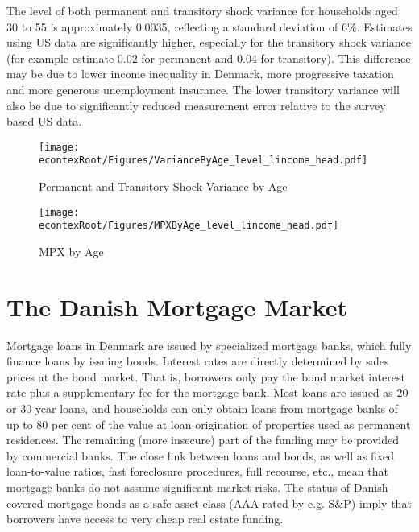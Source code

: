 \documentclass[titlepage]{\econtex}\newcommand{\texname}{ConsumptionHeterogeneity}
\begin{document}
The level of both permanent and transitory shock variance for households aged 30 to 55 is approximately 0.0035, reflecting a standard deviation of 6\%. Estimates using US data are significantly higher, especially for the transitory shock variance (for example \cite{carroll_nature_1997} estimate 0.02 for permanent and 0.04 for transitory). This difference may be due to lower income inequality in Denmark, more progressive taxation and more generous unemployment insurance. The lower transitory variance will also be due to significantly reduced measurement error relative to the survey based US data. 
\begin{figure} 
	\begin{centering}
		\texttt{[image: \\econtexRoot/Figures/VarianceByAge\_level\_lincome\_head.pdf]} 
		\caption{Permanent and Transitory Shock Variance by Age}
		\label{fig:VarianceByAge}
	\end{centering}
\end{figure}
\begin{figure} 
	\begin{centering}
		\texttt{[image: \\econtexRoot/Figures/MPXByAge\_level\_lincome\_head.pdf]} 
		\caption{MPX by Age}
		\label{fig:MPXByAge}
	\end{centering}
\end{figure}

\section{The Danish Mortgage Market} \label{mortgage_market}
\setcounter{figure}{0}   
\setcounter{table}{0} 
Mortgage loans in Denmark are issued by specialized mortgage banks, which fully finance loans by issuing bonds. Interest rates are directly determined by sales prices at the bond market. That is, borrowers only pay the bond market interest rate plus a supplementary fee for the mortgage bank. 
Most loans are issued as 20 or 30-year loans, and households can only obtain loans from mortgage banks of up to 80 per cent of the value at loan origination of properties used as permanent residences. The remaining (more insecure) part of the funding may be provided by commercial banks. The close link between loans and bonds, as well as fixed loan-to-value ratios, fast foreclosure procedures, full recourse, etc., mean that mortgage banks do not assume significant market risks. The status of Danish covered mortgage bonds as a safe asset class (AAA-rated by e.g. S\&P) imply that borrowers have access to very cheap real estate funding.
\end{document}
